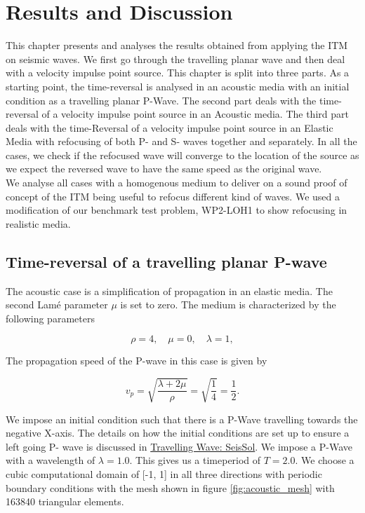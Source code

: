 \chapter{Results and Discussion}\label{chapter:Results}

This chapter presents and analyses the results obtained from applying the \ac{ITM} on seismic waves. We first go through the travelling planar wave and then deal with
a velocity impulse point source. This chapter is split into three parts. As a starting point, the time-reversal is analysed in an acoustic media with an initial condition
as a travelling planar P-Wave. The second part deals with the time-reversal of a velocity impulse point source in an Acoustic media. The third part deals with the time-Reversal
of a velocity impulse point source in an Elastic Media with refocusing of both P- and S- waves together and separately. In all the cases, we check if the refocused
wave will converge to the location of the source as we expect the reversed wave to have the same speed as the original wave. \\

We analyse all cases with a homogenous medium to deliver on a sound proof of concept of the \ac{ITM} being useful to refocus different kind of waves. We used a modification
of our benchmark test problem, WP2-LOH1 to show refocusing in realistic media.

\section{Time-reversal of a travelling planar P-wave} \label{sec:acoustictravelling}
The acoustic case is a simplification of propagation in an elastic media. The second Lam\'{e} parameter $\mu$ is set to zero. The medium is characterized by the following parameters

\begin{equation}
    \rho = 4, \quad \mu = 0, \quad \lambda = 1 ,
\end{equation}

The propagation speed of the P-wave in this case is given by

\begin{equation}
    v_p = \sqrt{\frac{\lambda + 2 \mu}{\rho}} = \sqrt{\frac{1}{4}} = \frac{1}{2} .
\end{equation}

We impose an initial condition such that there is a P-Wave travelling towards the negative X-axis. The details on how the initial conditions are set up to ensure a left going P- wave is discussed in
\href{https://seissol.readthedocs.io/en/latest/initial-condition.html#travelling-wave}{Travelling Wave: SeisSol}. We impose a P-Wave with a wavelength of 
$\lambda = 1.0$. This gives us a timeperiod of $T=2.0$. We choose a cubic computational domain of [-1, 1] in all three directions with periodic boundary conditions with the mesh shown in figure \ref{fig:acoustic_mesh} with
163840 triangular elements. 

